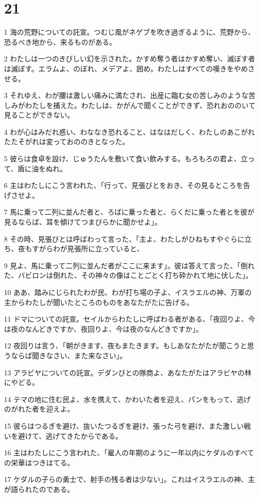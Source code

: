 \chapter{21}

\par 1 海の荒野についての託宣。つむじ風がネゲブを吹き過ぎるように、荒野から、恐るべき地から、来るものがある。
\par 2 わたしは一つのきびしい幻を示された。かすめ奪う者はかすめ奪い、滅ぼす者は滅ぼす。エラムよ、のぼれ、メデアよ、囲め。わたしはすべての嘆きをやめさせる。
\par 3 それゆえ、わが腰は激しい痛みに満たされ、出産に臨む女の苦しみのような苦しみがわたしを捕えた。わたしは、かがんで聞くことができず、恐れおののいて見ることができない。
\par 4 わが心はみだれ惑い、わななき恐れること、はなはだしく、わたしのあこがれたたそがれは変っておののきとなった。
\par 5 彼らは食卓を設け、じゅうたんを敷いて食い飲みする。もろもろの君よ、立って、盾に油をぬれ。
\par 6 主はわたしにこう言われた、「行って、見張びとをおき、その見るところを告げさせよ。
\par 7 馬に乗って二列に並んだ者と、ろばに乗った者と、らくだに乗った者とを彼が見るならば、耳を傾けてつまびらかに聞かせよ」。
\par 8 その時、見張びとは呼ばわって言った、「主よ、わたしがひねもすやぐらに立ち、夜もすがらわが見張所に立っていると、
\par 9 見よ、馬に乗って二列に並んだ者がここに来ます」。彼は答えて言った、「倒れた、バビロンは倒れた、その神々の像はことごとく打ち砕かれて地に伏した」。
\par 10 ああ、踏みにじられたわが民、わが打ち場の子よ、イスラエルの神、万軍の主からわたしが聞いたところのものをあなたがたに告げる。
\par 11 ドマについての託宣。セイルからわたしに呼ばわる者がある、「夜回りよ、今は夜のなんどきですか、夜回りよ、今は夜のなんどきですか」。
\par 12 夜回りは言う、「朝がきます、夜もまたきます。もしあなたがたが聞こうと思うならば聞きなさい、また来なさい」。
\par 13 アラビヤについての託宣。デダンびとの隊商よ、あなたがたはアラビヤの林にやどる。
\par 14 テマの地に住む民よ、水を携えて、かわいた者を迎え、パンをもって、逃げのがれた者を迎えよ。
\par 15 彼らはつるぎを避け、抜いたつるぎを避け、張った弓を避け、また激しい戦いを避けて、逃げてきたからである。
\par 16 主はわたしにこう言われた、「雇人の年期のように一年以内にケダルのすべての栄華はつきはてる。
\par 17 ケダルの子らの勇士で、射手の残る者は少ない」。これはイスラエルの神、主が語られたのである。

